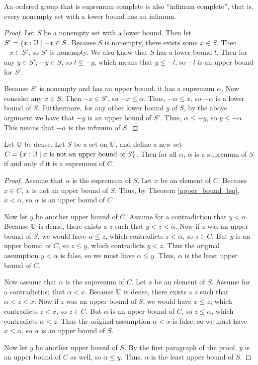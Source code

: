 \documentclass[../math.tex]{subfiles}
\begin{document}
\begin{theorem}
    An ordered group that is supremum complete is also ``infimum complete'',
    that is, every nonempty set with a lower bound has an infimum.
\end{theorem}
\begin{proof}
    Let $S$ be a nonempty set with a lower bound.  Then let $S' = \{x : \mathbb{U} \mid
    -x \in S$.  Because $S$ is nonempty, there exists some $x \in S$.  Then $-x
    \in S'$, so $S'$ is nonempty.  We also know that $S$ has a lower bound $l$.
    Then for any $y \in S'$, $-y \in S$, so $l \leq -y$, which means that $y
    \leq -l$, so $-l$ is an upper bound for $S'$.

    Because $S'$ is nonempty and has an upper bound, it has a supremum $\alpha$.
    Now consider any $x \in S$.  Then $-x \in S'$, so $-x \leq \alpha$.  Thus,
    $-\alpha \leq x$, so $-\alpha$ is a lower bound of $S$.  Furthermore, for
    any other lower bound $y$ of $S$, by the above argument we have that $-y$ is
    an upper bound of $S'$.  Thus, $\alpha \leq -y$, so $y \leq -\alpha$.  This
    means that $-\alpha$ is the infimum of $S$.
\end{proof}

\begin{theorem}
    Let $\mathbb{U}$ be dense.  Let $S$ be a set on $\mathbb{U}$, and define a new set $C = \{x
    : \mathbb{U} \mid \text{$x$ is not an upper bound of $S$}\}$.  Then for all
    $\alpha$, $\alpha$ is a supremum of $S$ if and only if it is a supremum of
    $C$.
\end{theorem}
\begin{proof}
    Assume that $\alpha$ is the supremum of $S$.  Let $x$ be an element of $C$.
    Because $x \in C$, $x$ is not an upper bound of $S$.  Thus, by Theorem
    \ref{upper_bound_leq}, $x < \alpha$, so $\alpha$ is an upper bound of $C$.

    Now let $y$ be another upper bound of $C$.  Assume for a contradiction that
    $y < \alpha$.  Because $\mathbb{U}$ is dense, there exists a $z$ such that $y < z <
    \alpha$.  Now if $z$ was an upper bound of $S$, we would have $\alpha \leq
    z$, which contradicts $z < \alpha$, so $z \in C$.  But $y$ is an upper bound
    of $C$, so $z \leq y$, which contradicts $y < z$.  Thus the original
    assumption $y < \alpha$ is false, so we must have $\alpha \leq y$.  Thus,
    $\alpha$ is the least upper bound of $C$.

    Now assume that $\alpha$ is the supremum of $C$.  Let $x$ be an element of
    $S$.  Assume for a contradiction that $\alpha < x$.  Because $\mathbb{U}$ is dense,
    there exists a $z$ such that $\alpha < z < x$.  Now if $z$ was an upper
    bound of $S$, we would have $x \leq z$, which contradicts $z < x$, so $z \in
    C$.  But $\alpha$ is an upper bound of $C$, so $z \leq \alpha$, which
    contradicts $\alpha < z$.  Thus the original assumption $\alpha < x$ is
    false, so we must have $x \leq \alpha$, so $\alpha$ is an upper bound of
    $S$.

    Now let $y$ be another upper bound of $S$.  By the first paragraph of the
    proof, $y$ is an upper bound of $C$ as well, so $\alpha \leq y$.  Thus,
    $\alpha$ is the least upper bound of $S$.
\end{proof}
\end{document}
